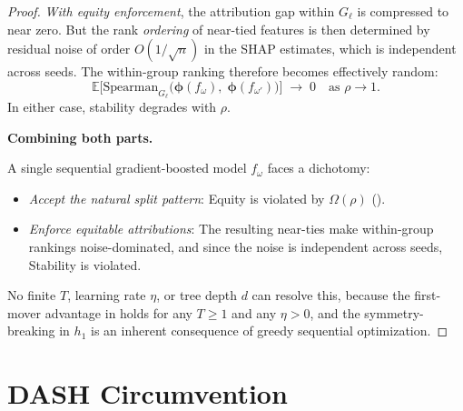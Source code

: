 \documentclass[11pt]{article}
\theoremstyle{remark}
\newcommand{\Gl}{G_\ell}                    %
\newcommand{\totalT}{T}                     %
\newcommand{\rhovar}{\rho}                  %
\newcommand{\Exp}{\mathbb{E}}              %
\begin{document}
\begin{proof}
\emph{With equity enforcement}, the attribution gap within $\Gl$ is
compressed to near zero.  But the rank \emph{ordering} of near-tied
features is then determined by residual noise of order
$O(1/\sqrt{n})$ in the SHAP estimates, which is independent across
seeds.  The within-group ranking therefore becomes effectively random:
\begin{equation}
  \Exp\bigl[\mathrm{Spearman}_{\Gl}\bigl(
    \boldsymbol{\phi}(f_\omega),\;
    \boldsymbol{\phi}(f_{\omega'})
  \bigr)\bigr] \;\to\; 0
  \quad \text{as } \rhovar \to 1.
\end{equation}
In either case, stability degrades with $\rhovar$.

\medskip
\noindent\textbf{Combining both parts.}

A single sequential gradient-boosted model $f_\omega$ faces a dichotomy:
\begin{itemize}
  \item \emph{Accept the natural split pattern}: Equity is violated by
    $\Omega(\rhovar)$ ().
  \item \emph{Enforce equitable attributions}: The resulting near-ties
    make within-group rankings noise-dominated, and since the noise is
    independent across seeds, Stability is violated.
\end{itemize}
No finite $\totalT$, learning rate $\eta$, or tree depth $d$ can resolve
this, because the first-mover advantage in
 holds for any $\totalT \geq 1$ and any
$\eta > 0$, and the symmetry-breaking in $h_1$ is an inherent
consequence of greedy sequential optimization.
\end{proof}


\section{DASH Circumvention}
\label{sec:circumvention}
\end{document}
